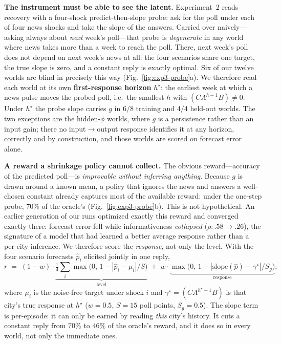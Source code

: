 \textbf{The instrument must be able to see the latent.}  Experiment~2 reads recovery with a four-shock
predict-then-slope probe: ask for the poll under each of four news shocks and take the slope of the
answers. Carried over naively---asking always about \emph{next} week's poll---that probe is
\emph{degenerate} in any world where news takes more than a week to reach the poll. There, next week's
poll does not depend on next week's news at all: the four scenarios share one target, the true slope is
zero, and a constant reply is exactly optimal. Six of our twelve worlds are blind in precisely this way
(Fig.~\ref{fig:exp3-probe}a). We therefore read each world at its own \textbf{first-response horizon}
$h^\star$: the earliest week at which a news pulse moves the probed poll, i.e.\ the smallest $h$ with
$(C A^{h-1} B)\neq 0$. Under $h^\star$ the probe slope carries $g$ in $6/8$ training and $4/4$ held-out
worlds. The two exceptions are the hidden-$\phi$ worlds, where $g$ is a persistence rather than an input
gain; there no input$\to$output response identifies it at any horizon, correctly and by construction, and
those worlds are scored on forecast error alone.

\textbf{A reward a shrinkage policy cannot collect.}  The obvious reward---accuracy of the predicted
poll---is \emph{improvable without inferring anything}. Because $g$ is drawn around a known mean, a
policy that ignores the news and answers a well-chosen constant already captures most of the available
reward: under the one-step probe, $70\%$ of the oracle's (Fig.~\ref{fig:exp3-probe}b). This is not
hypothetical. An earlier generation of our runs optimized exactly this reward and converged exactly
there: forecast error fell while informativeness \emph{collapsed} ($\rho: .58\!\to\!.26$), the signature
of a model that had learned a better average response rather than a per-city inference. We therefore
score the \emph{response}, not only the level. With the four scenario forecasts $\hat p_i$ elicited
jointly in one reply,
\begin{equation}
r \;=\; (1-w)\cdot\underbrace{\tfrac14\textstyle\sum_i \max\!\big(0,\,1-|\hat p_i-\mu_i|/S\big)}_{\text{level}}
\;+\; w\cdot\underbrace{\max\!\big(0,\,1-|\mathrm{slope}(\hat p)-\gamma^\star|/S_g\big)}_{\text{response}},
\label{eq:exp3-reward}
\end{equation}
where $\mu_i$ is the noise-free target under shock $i$ and $\gamma^\star=(CA^{h^\star-1}B)$ is that
city's true response at $h^\star$ ($w{=}0.5$, $S{=}15$ poll points, $S_g{=}0.5$). The slope term is
per-episode: it can only be earned by reading \emph{this} city's history. It cuts a constant reply from
$70\%$ to $46\%$ of the oracle's reward, and it does so in every world, not only the immediate ones.


